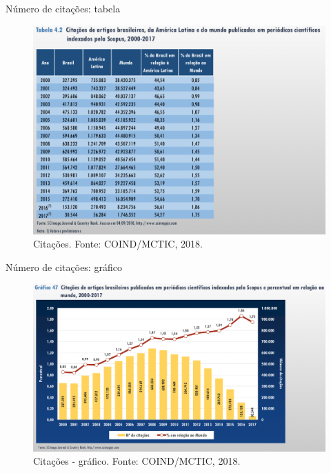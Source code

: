 \begin{frame}{Número de citações: tabela}
\begin{figure}
\centering
\includegraphics[scale=0.25]{figs/01/panorama-citacoes-tabela}
\caption{Citações. Fonte: COIND/MCTIC, 2018.}
\end{figure}
\end{frame}

\begin{frame}{Número de citações: gráfico}
\begin{figure}
\centering
\includegraphics[scale=0.25]{figs/01/panorama-citacoes}
\caption{Citações - gráfico. Fonte: COIND/MCTIC, 2018.}
\end{figure}
\end{frame}

